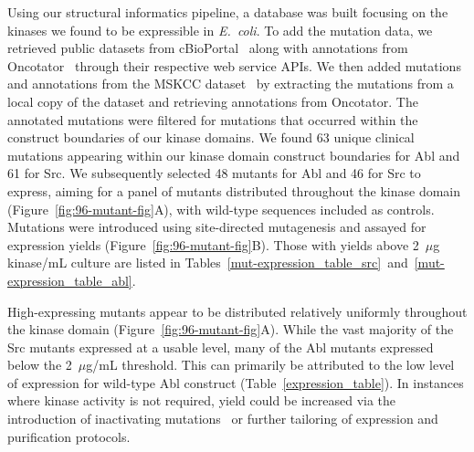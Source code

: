 \documentclass[phd,tocprelim]{cornell}
\begin{document}
Using our structural informatics pipeline, a database was built focusing on the kinases we found to be expressible in \emph{E.~coli}.
To add the mutation data, we retrieved public datasets from cBioPortal~\citep{Cerami:2012eu,Gao:2013kd} along with annotations from Oncotator~\citep{Ramos:2015ew} through their respective web service APIs.
We then added mutations and annotations from the MSKCC dataset~\citep{Zehir:2017ib} by extracting the mutations from a local copy of the dataset and retrieving annotations from Oncotator. 
The annotated mutations were filtered for mutations that occurred within the construct boundaries of our kinase domains. 
We found 63 unique clinical mutations appearing within our kinase domain construct boundaries for Abl and 61 for Src. 
We subsequently selected 48 mutants for Abl and 46 for Src to express, aiming for a panel of mutants distributed throughout the kinase domain (Figure~\ref{fig:96-mutant-fig}A), with wild-type sequences included as controls. 
Mutations were introduced using site-directed mutagenesis and assayed for expression yields (Figure~\ref{fig:96-mutant-fig}B).
Those with yields above 2~$\mu$g kinase/mL culture are listed in Tables~\ref{mut-expression_table_src}~and~\ref{mut-expression_table_abl}.

High-expressing mutants appear to be distributed relatively uniformly throughout the kinase domain (Figure~\ref{fig:96-mutant-fig}A).
While the vast majority of the Src mutants expressed at a usable level, many of the Abl mutants expressed below the 2~$\mu$g/mL threshold. 
This can primarily be attributed to the low level of expression for wild-type Abl construct (Table~\ref{expression_table}). 
In instances where kinase activity is not required, yield could be increased via the introduction of inactivating mutations~\citep{seeliger:2005:protein-sci:kinase-expression} or further tailoring of expression and purification protocols. 
\end{document}
